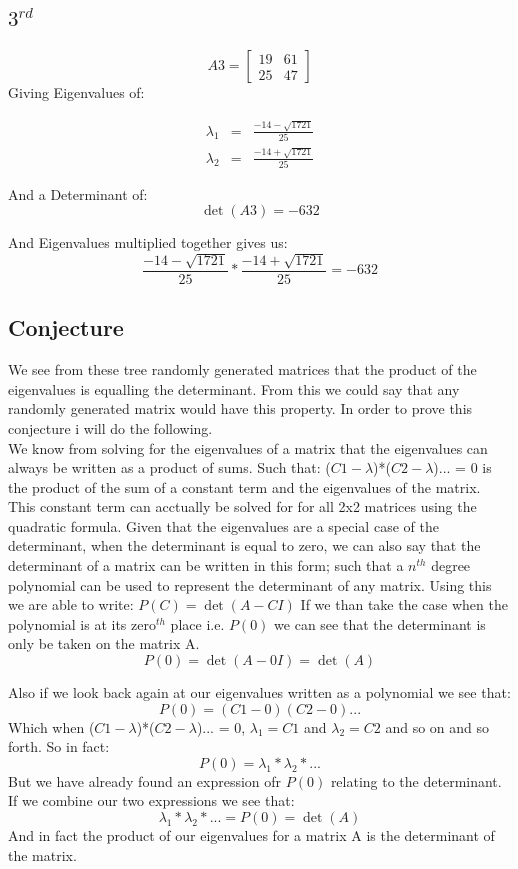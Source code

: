 \documentclass[12pt]{article}
\begin{document}
\subsection*{$3^{rd}$}
\[
A3 =
\begin{bmatrix}
19 & 61\\
25 & 47
\end{bmatrix}
\]
Giving Eigenvalues of:

\begin{eqnarray*}
\lambda_1 &=& \frac{-14-\sqrt{1721}}{25}\\
\lambda_2 &=& \frac{-14+\sqrt{1721}}{25}
\end{eqnarray*}

And a Determinant of:
$$ \det (A3) = -632 $$

And Eigenvalues multiplied together gives us:
$$ \frac{-14-\sqrt{1721}}{25} * \frac{-14+\sqrt{1721}}{25} = -632 $$

\subsection*{Conjecture}

We see from these tree randomly generated matrices that the product of the eigenvalues is equalling the determinant. From this we could say that any randomly generated matrix would have this property. In order to prove this conjecture i will do the following.\\

	We know from solving for the eigenvalues of a matrix that the eigenvalues can always be written as a product of sums. Such that: ($C1 - \lambda$)*($C2 - \lambda$)... = 0 is the product of the sum of a constant term and the eigenvalues of the matrix. This constant term can acctually be solved for for all 2x2 matrices using the quadratic formula. Given that the eigenvalues are a special case of the determinant, when the determinant is equal to zero, we can also say that the determinant of a matrix can be written in this form; such that a $n^{th}$ degree polynomial can be used to represent the determinant of any matrix. Using this we are able to write:
$P(C) = \det (A - CI) $
If we than take the case when the polynomial is at its zero$^{th}$ place i.e. $P(0)$ we can see that the determinant is only be taken on the matrix A.
$$ P(0) = \det (A - 0I) = \det (A) $$

Also if we look back again at our eigenvalues written as a polynomial we see that:
$$ P(0) = (C1 - 0)(C2 - 0)... $$
Which when ($C1 - \lambda$)*($C2 - \lambda$)... = 0, $\lambda_1 = C1$ and $\lambda_2 = C2$ and so on and so forth. So in fact:
$$ P(0) = \lambda_1 * \lambda_2 * ... $$
But we have already found an expression ofr $P(0)$ relating to the determinant. If we combine our two expressions we see that:
$$ \lambda_1 * \lambda_2 * ... = P(0) = \det (A) $$
And in fact the product of our eigenvalues for a matrix A is the determinant of the matrix.
\end{document}
